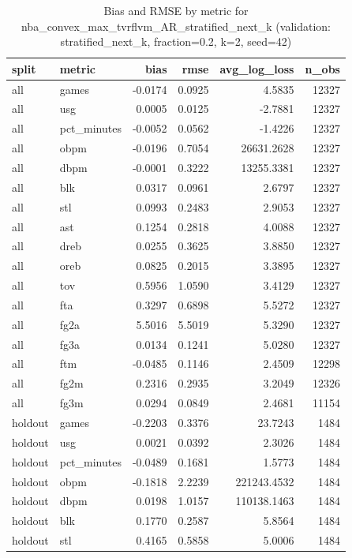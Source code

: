\begin{table}
\caption{Bias and RMSE by metric for nba_convex_max_tvrflvm_AR_stratified_next_k (validation: stratified_next_k, fraction=0.2, k=2, seed=42)}
\label{tab:nba_convex_max_tvrflvm_AR_stratified_next_k_vs_stratified_next_k_f20_k2_s42_bias_rmse}
\begin{tabular}{llrrrr}
\toprule
split & metric & bias & rmse & avg\_log\_loss & n\_obs \\
\midrule
all & games & -0.0174 & 0.0925 & 4.5835 & 12327 \\
all & usg & 0.0005 & 0.0125 & -2.7881 & 12327 \\
all & pct\_minutes & -0.0052 & 0.0562 & -1.4226 & 12327 \\
all & obpm & -0.0196 & 0.7054 & 26631.2628 & 12327 \\
all & dbpm & -0.0001 & 0.3222 & 13255.3381 & 12327 \\
all & blk & 0.0317 & 0.0961 & 2.6797 & 12327 \\
all & stl & 0.0993 & 0.2483 & 2.9053 & 12327 \\
all & ast & 0.1254 & 0.2818 & 4.0088 & 12327 \\
all & dreb & 0.0255 & 0.3625 & 3.8850 & 12327 \\
all & oreb & 0.0825 & 0.2015 & 3.3895 & 12327 \\
all & tov & 0.5956 & 1.0590 & 3.4129 & 12327 \\
all & fta & 0.3297 & 0.6898 & 5.5272 & 12327 \\
all & fg2a & 5.5016 & 5.5019 & 5.3290 & 12327 \\
all & fg3a & 0.0134 & 0.1241 & 5.0280 & 12327 \\
all & ftm & -0.0485 & 0.1146 & 2.4509 & 12298 \\
all & fg2m & 0.2316 & 0.2935 & 3.2049 & 12326 \\
all & fg3m & 0.0294 & 0.0849 & 2.4681 & 11154 \\
holdout & games & -0.2203 & 0.3376 & 23.7243 & 1484 \\
holdout & usg & 0.0021 & 0.0392 & 2.3026 & 1484 \\
holdout & pct\_minutes & -0.0489 & 0.1681 & 1.5773 & 1484 \\
holdout & obpm & -0.1818 & 2.2239 & 221243.4532 & 1484 \\
holdout & dbpm & 0.0198 & 1.0157 & 110138.1463 & 1484 \\
holdout & blk & 0.1770 & 0.2587 & 5.8564 & 1484 \\
holdout & stl & 0.4165 & 0.5858 & 5.0006 & 1484 \\

\end{tabular}
\end{table}
